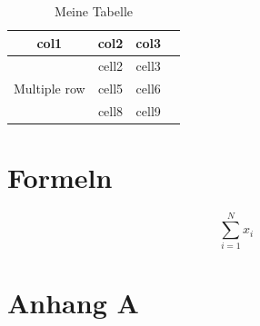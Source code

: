 \documentclass[12pt,oneside]{article}
\begin{document}
\begin{table}[ht]
    \centering
    \caption{Meine Tabelle}
        \begin{tabular}{ cccc } 
        \toprule
        col1 & col2 & col3 \\
        \midrule
        \multirow{3}{4em}{Multiple row} & cell2 & cell3 \\ 
        & cell5 & cell6 \\ 
        & cell8 & cell9 \\ 
        \bottomrule
    \end{tabular}
    \label{tab:countries}
\end{table}

\section{Formeln}

\begin{equation}
    \sum_{i=1}^N x_i
    \label{eq:1}
\end{equation}



\clearpage
\lhead{}
\printbibliography
{}


\clearpage
\appendix
\section{Anhang A}


\end{document}

